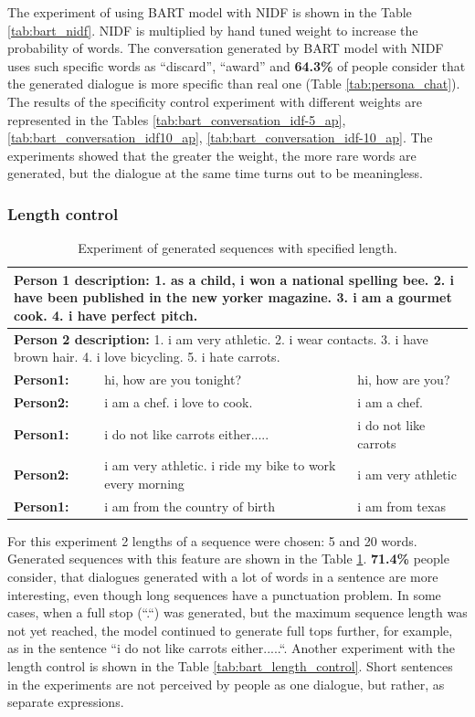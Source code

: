The experiment of using BART model with NIDF is shown in the Table \ref{tab:bart_nidf}. NIDF is multiplied by hand tuned weight to increase the probability of words. The conversation generated by BART model with NIDF uses such specific words as ``discard'', ``award'' and \textbf{64.3\%} of people consider that the generated dialogue is more specific than real one (Table \ref{tab:persona_chat}). The results of the specificity control experiment with different weights are represented in the Tables \ref{tab:bart_conversation_idf-5_ap}, \ref{tab:bart_conversation_idf10_ap}, \ref{tab:bart_conversation_idf-10_ap}. The experiments showed that the greater the weight, the more rare words are generated, but the dialogue at the same time turns out to be meaningless.

\subsubsection{Length control}
\begin{table}[ht]
\centering
 \begin{tabular}{|p{2cm}|p{6cm}|p{6cm}|} 
 \hline
 \multicolumn{3}{|p{14cm}|}{\textbf{Person 1 description:} 1. as a child, i won a national spelling bee. 2. i have been published in the new yorker magazine. 3. i am a gourmet cook. 4. i have perfect pitch. }\\
 \hline
 \multicolumn{3}{|p{14cm}|}{\textbf{Person 2 description:} 1. i am very athletic. 2. i wear contacts. 3. i have brown hair. 4. i love bicycling. 5. i hate carrots.} \\
 \hline
 \textbf{Person1:} & hi, how are you tonight? & hi, how are you?\\
 \hline
 \textbf{Person2:} & i am a chef. i love to cook. & i am a chef. \\
 \hline
 \textbf{Person1:} & i do not like carrots either..... & i do not like carrots\\
 \hline 
 \textbf{Person2:} & i am very athletic. i ride my bike to work every morning & i am very athletic\\
 \hline 
 \textbf{Person1:} & i am from the country of birth & i am from texas\\
 \hline
 \end{tabular}
 \caption{Experiment of generated sequences with specified length.}
\label{tab:set_len}
\end{table}
For this experiment 2 lengths of a sequence were chosen: 5 and 20 words. Generated sequences with this feature are shown in the Table \ref{tab:set_len}. \textbf{71.4\%} people consider, that dialogues generated with a lot of words in a sentence are more interesting, even though long sequences have a punctuation problem. In some cases, when a full stop (``.``) was generated, but the maximum sequence length was not yet reached, the model continued to generate full tops further, for example, as in the sentence ``i do not like carrots either.....``. Another experiment with the length control is shown in the Table \ref{tab:bart_length_control}. Short sentences in the experiments are not perceived by people as one dialogue, but rather, as separate expressions.

